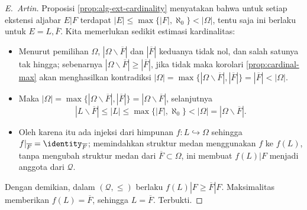 \begin{proof}[E.\ Artin]
	Proposisi \ref{prop:alg-ext-cardinality} menyatakan bahwa untuk setiap ekstensi aljabar $E|F$ terdapat $|E| \leq \max\{|F|, \aleph_0\} < |\Omega|$, tentu saja ini berlaku untuk $E = L, \overline{F}$. Kita memerlukan sedikit estimasi kardinalitas:
	\begin{itemize}
		\item Menurut pemilihan $\Omega$, $|\Omega \smallsetminus \overline{F}|$ dan $|\overline{F}|$ keduanya tidak nol, dan salah satunya tak hingga; sebenarnya $|\Omega \smallsetminus \overline{F}| \geq |\overline{F}|$, jika tidak maka korolari \ref{prop:cardinal-max} akan menghasilkan kontradiksi $|\Omega| = \max\{|\Omega \smallsetminus \overline{F}|, |\overline{F}|\} = |\overline{F}| < |\Omega|$.
		\item Maka $|\Omega| = \max\{|\Omega \smallsetminus \overline{F}|, |\overline{F}|\} = |\Omega \smallsetminus \overline{F}|$, selanjutnya
			\[ |L \smallsetminus \overline{F}| \leq |L| \leq \max\{|F|, \aleph_0\} < |\Omega| = |\Omega \smallsetminus \overline{F}|. \] 
		\item Oleh karena itu ada injeksi dari himpunan $f: L \hookrightarrow \Omega$ sehingga $f|_{\overline{F}} = \identity_{\overline{F}}$; memindahkan struktur medan menggunakan $f$ ke $f(L)$, tanpa mengubah struktur medan dari $\overline{F} \subset \Omega$, ini membuat $f(L)|F$ menjadi anggota dari $\mathcal{Q}$.
	\end{itemize}
	Dengan demikian, dalam $(\mathcal{Q}, \leq)$ berlaku $f(L)|F \geq \overline{F}|F$. Maksimalitas memberikan $f(L)=\overline{F}$, sehingga $L=\overline{F}$. Terbukti.
\end{proof}

